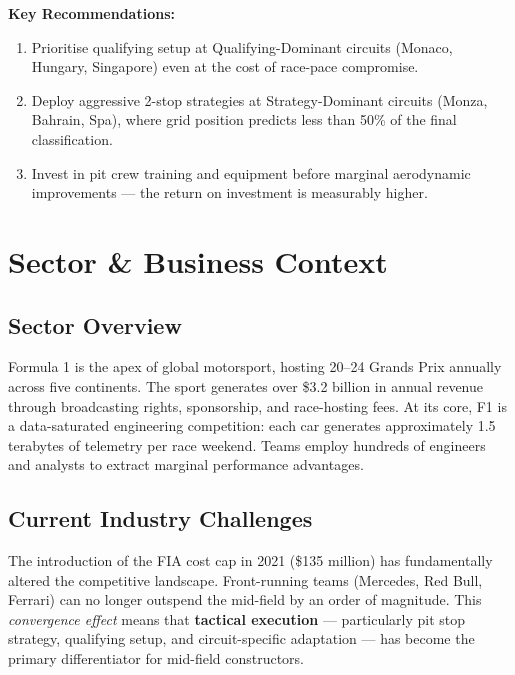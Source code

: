 \documentclass[12pt, a4paper]{article}
\begin{document}
\textbf{Key Recommendations:}
\begin{enumerate}
    \item Prioritise qualifying setup at Qualifying-Dominant circuits (Monaco, Hungary, Singapore) even at the cost of race-pace compromise.
    \item Deploy aggressive 2-stop strategies at Strategy-Dominant circuits (Monza, Bahrain, Spa), where grid position predicts less than 50\% of the final classification.
    \item Invest in pit crew training and equipment before marginal aerodynamic improvements --- the return on investment is measurably higher.
\end{enumerate}

\newpage

\section{Sector \& Business Context}

\subsection{Sector Overview}
Formula 1 is the apex of global motorsport, hosting 20--24 Grands Prix annually across five continents. The sport generates over \$3.2 billion in annual revenue through broadcasting rights, sponsorship, and race-hosting fees. At its core, F1 is a data-saturated engineering competition: each car generates approximately 1.5 terabytes of telemetry per race weekend. Teams employ hundreds of engineers and analysts to extract marginal performance advantages.

\subsection{Current Industry Challenges}
The introduction of the FIA cost cap in 2021 (\$135 million) has fundamentally altered the competitive landscape. Front-running teams (Mercedes, Red Bull, Ferrari) can no longer outspend the mid-field by an order of magnitude. This \textit{convergence effect} means that \textbf{tactical execution} --- particularly pit stop strategy, qualifying setup, and circuit-specific adaptation --- has become the primary differentiator for mid-field constructors.
\end{document}
